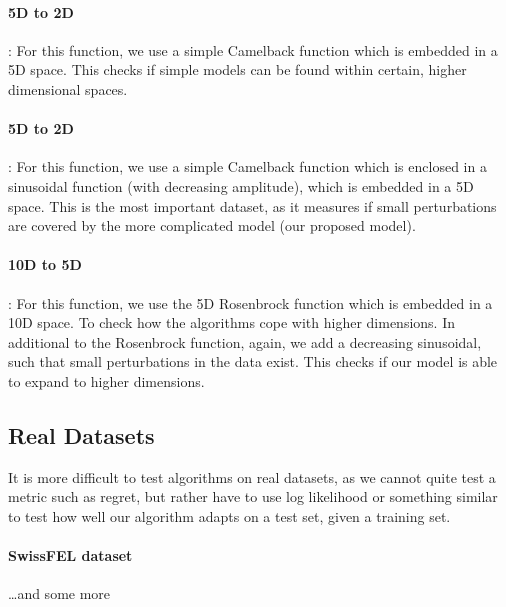 \paragraph{5D to 2D}: For this function, we use a simple Camelback function which is embedded in a 5D space.
This checks if simple models can be found within certain, higher dimensional spaces.
\paragraph{5D to 2D}: For this function, we use a simple Camelback function which is enclosed in a sinusoidal function (with decreasing amplitude), which is embedded in a 5D space.
This is the most important dataset, as it measures if small perturbations are covered by the more complicated model (our proposed model).
\paragraph{10D to 5D}: For this function, we use the 5D Rosenbrock function which is embedded in a 10D space.
To check how the algorithms cope with higher dimensions.
In additional to the Rosenbrock function, again, we add a decreasing sinusoidal, such that small perturbations in the data exist.
This checks if our model is able to expand to higher dimensions.

\subsection{Real Datasets}
It is more difficult to test algorithms on real datasets, as we cannot quite test a metric such as regret, but rather have to use log likelihood or something similar to test how well our algorithm adapts on a test set, given a training set.

\paragraph{SwissFEL dataset}
\dots and some more 


